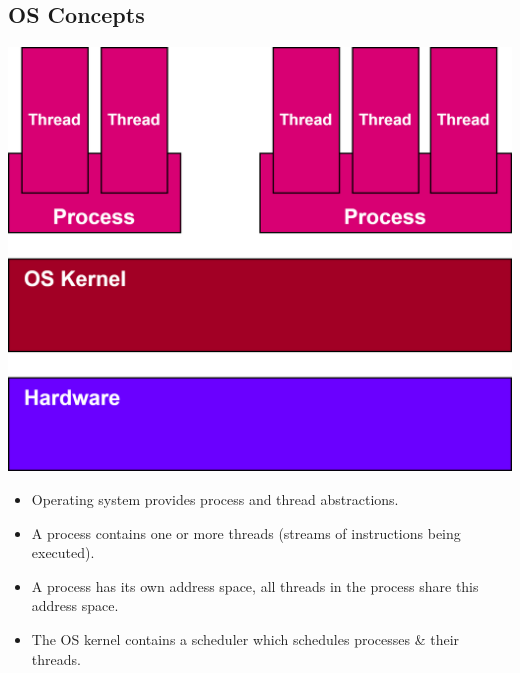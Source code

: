 \subsection{OS Concepts}
\begin{minipage}{.3\textwidth}
	\includegraphics[width=\textwidth]{introduction/images/os_stack.drawio.png}
\end{minipage}
\hfill
\begin{minipage}{.68\textwidth}
	\begin{itemize}
		\item Operating system provides process and thread abstractions.
		\item A process contains one or more threads (streams of instructions being executed).
		\item A process has its own address space, all threads in the process share this address space.
		\item The OS kernel contains a scheduler which schedules processes \& their threads.
	\end{itemize}
\end{minipage}

